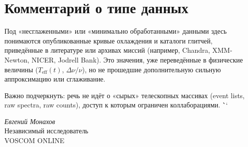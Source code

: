 \documentclass[a4paper,12pt]{article}
\begin{document}
\section{Комментарий о типе данных}
Под «несглаженными» или «минимально обработанными» данными здесь понимаются
опубликованные кривые охлаждения и каталоги глитчей, приведённые в литературе
или архивах миссий (например, Chandra, XMM-Newton, NICER, Jodrell Bank).
Это значения, уже переведённые в физические величины
($T_{\mathrm{eff}}(t)$, $\Delta\nu/\nu$), но не прошедшие дополнительную
сильную аппроксимацию или сглаживание.  

Важно подчеркнуть: речь не идёт о «сырых» телескопных массивах (event lists,
raw spectra, raw counts), доступ к которым ограничен коллаборациями.
\```



\vspace{2em}
\noindent
\textit{Евгений Монахов} \\
Независимый исследователь \\
VOSCOM ONLINE
\end{document}
